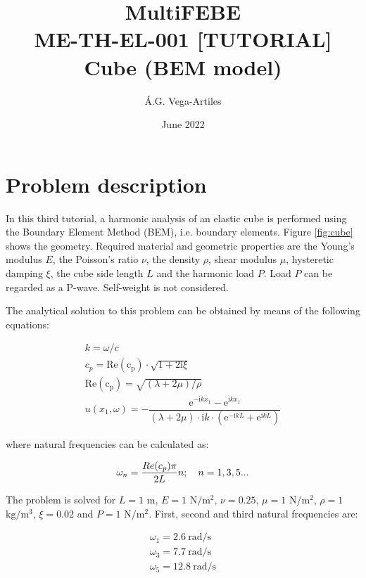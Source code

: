 \documentclass[a4]{article}
\title{MultiFEBE \\ ME-TH-EL-001 [TUTORIAL] \\ Cube (BEM model)}
\author{\'A.G. Vega-Artiles}
\date{June 2022}
\begin{document}
\maketitle

\tableofcontents 

\section{Problem description}

In this third tutorial, a harmonic analysis of an elastic cube is performed using the Boundary Element Method (BEM), i.e. boundary elements. Figure \ref{fig:cube} shows the geometry. Required material and geometric properties are the Young's modulus $E$, the Poisson's ratio  $\nu$, the density $\rho$, shear modulus $\mu$, hysteretic damping $\xi$, the cube side length $L$ and the harmonic load $P$. Load $P$ can be regarded as a P-wave. Self-weight is not considered. 

The analytical solution to this problem can be obtained by means of the following equations:

\begin{equation}
	\begin{array}{l}
		k = \omega/c \\
		c_p = \mathrm{Re(c_p)}\cdot\sqrt{1+2\mathrm{i}\xi} \\
		\mathrm{Re(c_p)} = \sqrt{(\lambda+2\mu)/\rho} \\
		u(x_1,\omega) = - \dfrac{\mathrm{e}^{-\mathrm{i}kx_1}-\mathrm{e}^{\mathrm{i}kx_1}}{(\lambda+2\mu)\cdot\mathrm{i}k\cdot(\mathrm{e}^{-\mathrm{i}kL}+\mathrm{e}^{\mathrm{i}kL})}
	\end{array}
\end{equation}

where natural frequencies can be calculated as:

\begin{equation}
	\centering
	\omega_n=\frac{Re(c_p)\pi}{2L}n;\quad n=1,3,5...
\end{equation}

The problem is solved for $L=1$ $\mathrm{m}$, $E=1$ $\mathrm{N/m^2}$, $\nu=0.25$, $\mu=1$ $\mathrm{N/m^2}$, $\rho=1$ $\mathrm{kg/m^3}$, $\xi=0.02$ and $P=1$ $\mathrm{N/m^2}$. First, second and third natural frequencies are: 

\begin{equation}
	\begin{array}{l}
		\omega_1 = 2.6 \medspace \mathrm{rad/s} \\
		\omega_3 = 7.7 \medspace \mathrm{rad/s} \\
		\omega_5 = 12.8 \medspace \mathrm{rad/s}
	\end{array}
\end{equation}
\end{document}
